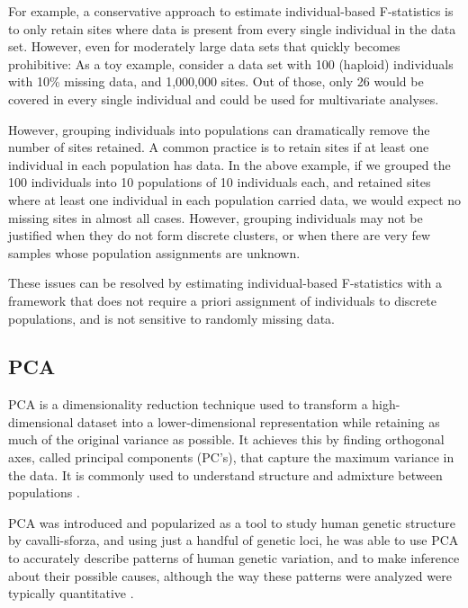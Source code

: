 \documentclass[12pt, letterpaper]{article}
\begin{document}
For example, a conservative approach to estimate individual-based F-statistics is to only retain sites where data is present from every single individual in the data set. However, even for moderately large data sets that quickly becomes prohibitive: As a toy example, consider a data set with 100 (haploid) individuals with 10\% missing data, and 1,000,000 sites. Out of those, only 26 would be covered in every single individual and could be used for multivariate analyses. 

However, grouping individuals into populations can dramatically remove the number of sites retained. A common practice is to retain sites if at least one individual in each population has data. In the above example, if we grouped the 100 individuals into 10 populations of 10 individuals each, and retained sites where at least one individual in each population carried data, we would expect no missing sites in almost all cases. However, grouping individuals may not be justified when they do not form discrete clusters, or when there are very few samples whose population assignments are unknown.

These issues can be resolved by estimating individual-based F-statistics with a framework that does not require a priori assignment of individuals to discrete populations, and is not sensitive to randomly missing data.


\subsection{PCA}

PCA is a dimensionality reduction technique used to transform a high-dimensional dataset into a lower-dimensional representation while retaining as much of the original variance as possible. It achieves this by finding orthogonal axes, called principal components (PC's), that capture the maximum variance in the data. It is commonly used to understand structure and admixture between populations \cite{patterson_population_2006,novembre_genes_2008,noauthor_cavalli-sforza_nodate,mcvean_genealogical_2009,brisbin_pcadmix_2012}. 

PCA was introduced and popularized as a tool to study human genetic structure by cavalli-sforza, and using just a handful of genetic loci, he was able to use PCA to accurately describe patterns of human genetic variation, and to make inference about their possible causes, although the way these patterns were analyzed were typically quantitative \cite{menozzi_synthetic_1978, sforza_great_1995, noauthor_cavalli-sforza_nodate}.
\end{document}

